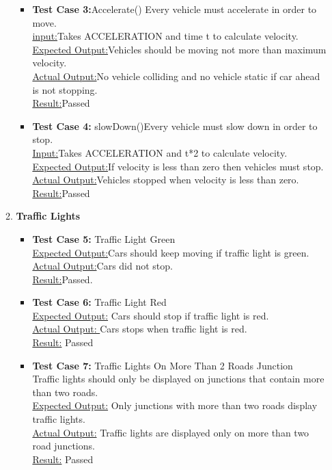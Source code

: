 \documentclass[11pt, oneside]{article}   	%
\begin{document}
\begin{itemize}
\begin{enumerate}
\begin{itemize}
	\item \textbf{Test Case 3:}Accelerate() Every vehicle must accelerate in order to move.\hfill \\
		\underline{input:}Takes ACCELERATION and time t to calculate velocity.\hfill \\
		\underline{Expected Output:}Vehicles should be moving not more than maximum velocity.\hfill \\
		\underline{Actual Output:}No vehicle colliding and no vehicle static if car ahead is not stopping.\hfill \\
		\underline{Result:}Passed\hfill \\

	\item \textbf{Test Case 4:} slowDown()Every vehicle must slow down in order to stop.\hfill \\
		\underline{Input:}Takes ACCELERATION and t*2 to calculate velocity.\hfill \\
		\underline{Expected Output:}If velocity is less than zero then vehicles must stop.\hfill \\
		\underline{Actual Output:}Vehicles stopped when velocity is less than zero.\hfill \\
		\underline{Result:}Passed\hfill \\
	\end{itemize}

\item \textbf{Traffic Lights}
	\begin{itemize}
		\item \textbf{Test Case 5:} Traffic Light Green \hfill \\
		\underline {Expected Output:}Cars should keep moving if traffic light is green.\hfill \\
		\underline{ Actual Output:}Cars did not stop.\hfil \\
		\underline{ Result:}Passed.

		\item \textbf{Test Case 6:} Traffic Light Red\hfill \\
		 \underline{Expected Output:} Cars should stop if traffic light is red.\hfill \\
		\underline{ Actual Output: }Cars stops when traffic light is red.\hfill \\
		 \underline{Result:} Passed
 
		 \item \textbf{Test Case 7:} Traffic Lights On More Than 2 Roads Junction\hfill \\
 		Traffic lights should only be displayed on junctions that contain more than two roads.\hfill \\
 		\underline{Expected Output:} Only junctions with more than two roads display traffic lights.\hfill \\
		\underline{Actual Output:} Traffic lights are displayed only on more than two road junctions.\hfill \\
		\underline{Result:} Passed\hfill \\


\end{itemize}
\end{enumerate}
\end{itemize}
\end{document}
